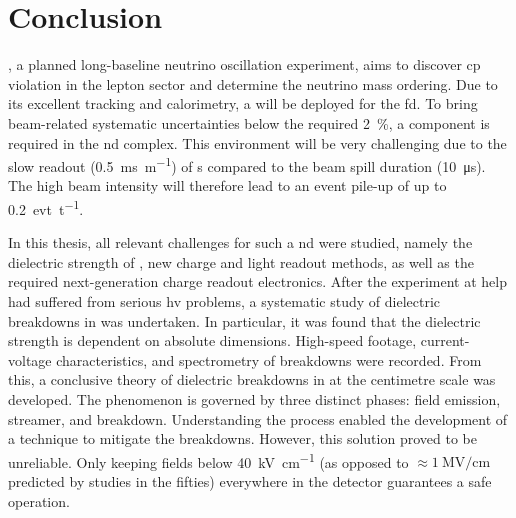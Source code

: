 \chapter{Conclusion}
\label{chap:conclusion}

\dune{}, a planned long-baseline neutrino oscillation experiment, aims to discover \gls{cp} violation in the lepton sector and determine the neutrino mass ordering.
Due to its excellent tracking and calorimetry, a \lartpc{} will be deployed for the \gls{fd}.
To bring beam-related systematic uncertainties below the required \SI{2}{\percent}, a \lartpc{} component is required in the \gls{nd} complex.
This environment will be very challenging due to the slow readout (\SI{0.5}{\milli\second\per\metre}) of \lartpc{}s compared to the beam spill duration (\SI{10}{\micro\second}).
The high beam intensity will therefore lead to an event pile-up of up to \SI{0.2}{evt\per\tonne_{}}.

In this thesis, all relevant challenges for such a \gls{nd} \lartpc{} were studied, namely the dielectric strength of \lar{}, new charge and light readout methods, as well as the required next-generation charge readout electronics.
After the \AT{} experiment at \gls{help} had suffered from serious \gls{hv} problems, a systematic study of dielectric breakdowns in \lar{} was undertaken.
In particular, it was found that the dielectric strength is dependent on absolute dimensions.
High-speed footage, current-voltage characteristics, and spectrometry of breakdowns were recorded.
From this, a conclusive theory of dielectric breakdowns in \lar{} at the centimetre scale was developed.
The phenomenon is governed by three distinct phases: field emission, streamer, and breakdown.
Understanding the process enabled the development of a technique to mitigate the breakdowns.
However, this solution proved to be unreliable.
Only keeping fields below \SI{40}{\kilo\volt\per\centi\metre} (as opposed to $\approx \SI{1}{\mega\volt\per\centi\metre}$ predicted by studies in the fifties) everywhere in the detector guarantees a safe operation.

